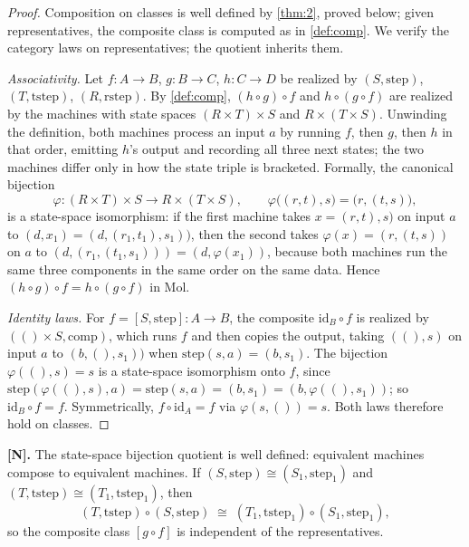 \begin{proof}
Composition on classes is well defined by \autoref{thm:2}, proved below; given
representatives, the composite class is computed as in \autoref{def:comp}. We
verify the category laws on representatives; the quotient inherits them.

\emph{Associativity.} Let $f : A \to B$, $g : B \to C$, $h : C \to D$ be
realized by $(S, \mathrm{step})$, $(T, \mathrm{tstep})$,
$(R, \mathrm{rstep})$. By \autoref{def:comp}, $(h \circ g) \circ f$ and
$h \circ (g \circ f)$ are realized by the machines with state spaces
$(R \times T) \times S$ and $R \times (T \times S)$. Unwinding the definition,
both machines process an input $a$ by running $f$, then $g$, then $h$ in that
order, emitting $h$'s output and recording all three next states; the two
machines differ only in how the state triple is bracketed. Formally, the
canonical bijection
\[ \varphi : (R \times T) \times S \to R \times (T \times S),
   \qquad \varphi\bigl ((r, t), s\bigr) = \bigl (r, (t, s)\bigr) , \]
is a state-space isomorphism: if the first machine takes
$x = (r, t), s)$ on input $a$ to $(d, x_1) = (d, (r_1, t_1), s_1))$, then
the second takes $\varphi (x) = (r, (t, s))$ on $a$ to
$(d, (r_1, (t_1, s_1))) = (d, \varphi (x_1))$, because both machines run the
same three components in the same order on the same data. Hence
$(h \circ g) \circ f = h \circ (g \circ f)$ in Mol.

\emph{Identity laws.} For $f = [S, \mathrm{step}] : A \to B$, the composite
$\mathrm{id}_B \circ f$ is realized by $(() \times S, \mathrm{comp})$, which
runs $f$ and then copies the output, taking $((), s)$ on input $a$ to
$(b, (), s_1))$ when $\mathrm{step} (s, a) = (b, s_1)$. The bijection
$\varphi ((), s) = s$ is a state-space isomorphism onto $f$, since
$\mathrm{step} (\varphi ((), s), a) = \mathrm{step} (s, a) = (b, s_1) =
(b, \varphi ((), s_1))$; so $\mathrm{id}_B \circ f = f$. Symmetrically,
$f \circ \mathrm{id}_A = f$ via $\varphi (s, ()) = s$. Both laws therefore
hold on classes.
\end{proof}

\begin{theorem}\label{thm:2}
\textbf{[N].} The state-space bijection quotient is well defined: equivalent
machines compose to equivalent machines. If
$(S, \mathrm{step}) \cong (S_1, \mathrm{step}_1)$ and
$(T, \mathrm{tstep}) \cong (T_1, \mathrm{tstep}_1)$, then
\[ (T, \mathrm{tstep}) \circ (S, \mathrm{step})
   \;\cong\; (T_1, \mathrm{tstep}_1) \circ (S_1, \mathrm{step}_1) , \]
so the composite class $[g \circ f]$ is independent of the representatives.
\end{theorem}

